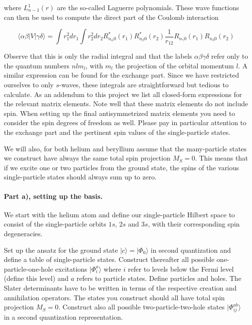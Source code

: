 \documentclass[%
oneside,                 %
final,                   %
10pt]{article}
\begin{document}
where $L_{n-1}^1(r)$ are the so-called Laguerre polynomials.  These
wave functions can then be used to compute the direct part of the
Coulomb interaction

\begin{equation*}
\langle \alpha\beta| V| \gamma\delta\rangle = \int r_1^2dr_1 \int r_2^2dr_2R_{n_{\alpha}0}^*(r_1) R_{n_{\beta}0}^*(r_2) 
  \frac{1}{r_{12}}R_{n_{\gamma}0}(r_1)R_{n_{\delta}0}(r_2)
\end{equation*}

Observe that this is only the radial integral and that the labels
$\alpha\beta\gamma\delta$ refer only to the quantum numbers $nlm_l$,
with $m_l$ the projection of the orbital momentum $l$.  A similar
expression can be found for the exchange part. Since we have
restricted ourselves to only $s$-waves, these integrals are
straightforward but tedious to calculate. As an addendum to this
project we list all closed-form expressions for the relevant matrix
elements. Note well that these matrix elements do not include
spin. When setting up the final antisymmetrized matrix elements you
need to consider the spin degrees of freedom as well. Please pay in
particular attention to the exchange part and the pertinent
spin values of the single-particle states.

We will also, for both helium and beryllium assume that the
many-particle states we construct have always the same total spin
projection $M_S=0$. This means that if we excite one or two particles
from the ground state, the spins of the various single-particle states
should always sum up to zero.

\paragraph{Part a), setting up the basis.}
We start with the helium atom and define our single-particle Hilbert
space to consist of the single-particle orbits $1s$, $2s$ and $3s$,
with their corresponding spin degeneracies.

Set up the ansatz for the ground state $|c\rangle = |\Phi_0\rangle$ in
second quantization and define a table of single-particle
states. Construct thereafter all possible one-particle-one-hole
excitations $|\Phi_i^a\rangle$ where $i$ refer to levels below the
Fermi level (define this level) and $a$ refers to particle
states. Define particles and holes. The Slater determinants have to be
written in terms of the respective creation and annihilation
operators.  The states you construct should all have total spin
projection $M_S=0$.  Construct also all possible two-particle-two-hole
states $|\Phi_{ij}^{ab}\rangle$ in a second quantization
representation.
\end{document}
